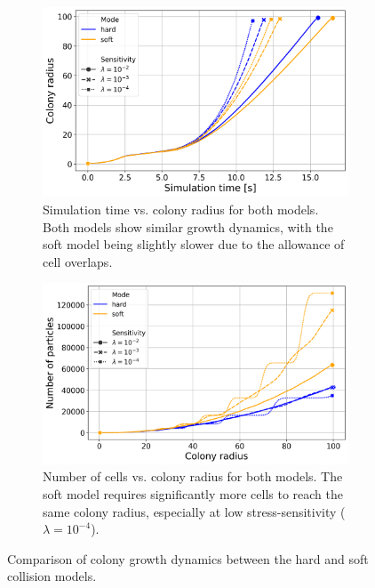 \documentclass[conference]{IEEEtran}
\begin{document}
\begin{figure}[h]
    \centering
    \begin{subfigure}[b]{\linewidth}
        \centering
        \includegraphics[width=\linewidth]{figures/comparison_plots/combined_simulation_time [s]_vs_colony_radius.png}
        \caption{Simulation time vs. colony radius for both models. Both models show similar growth dynamics, with the soft model being slightly slower due to the allowance of cell overlaps.}
        \label{fig:sim_time_vs_colony_radius}
    \end{subfigure}

    \begin{subfigure}[b]{\linewidth}
        \centering
        \includegraphics[width=\linewidth]{figures/comparison_plots/combined_colony_radius_vs_num_particles.png}
        \caption{Number of cells vs. colony radius for both models. The soft model requires significantly more cells to reach the same colony radius, especially at low stress-sensitivity ($\lambda = 10^{-4}$).}
        \label{fig:colony_radius_vs_num_cells}
    \end{subfigure}

    \caption{Comparison of colony growth dynamics between the hard and soft collision models.}
    \label{fig:comparison_combined}
\end{figure}
\end{document}
